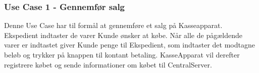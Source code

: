 \subsubsection{Use Case 1 - Gennemfør salg}
Denne Use Case har til formål at gennemføre et salg på Kasseapparat.
Ekspedient indtaster de varer Kunde ønsker at købe. Når alle de pågældende varer er indtastet giver Kunde penge til Ekspedient, som indtaster det modtagne beløb og trykker på knappen til kontant betaling. KasseApparat vil derefter registrere købet og sende informationer om købet til CentralServer.